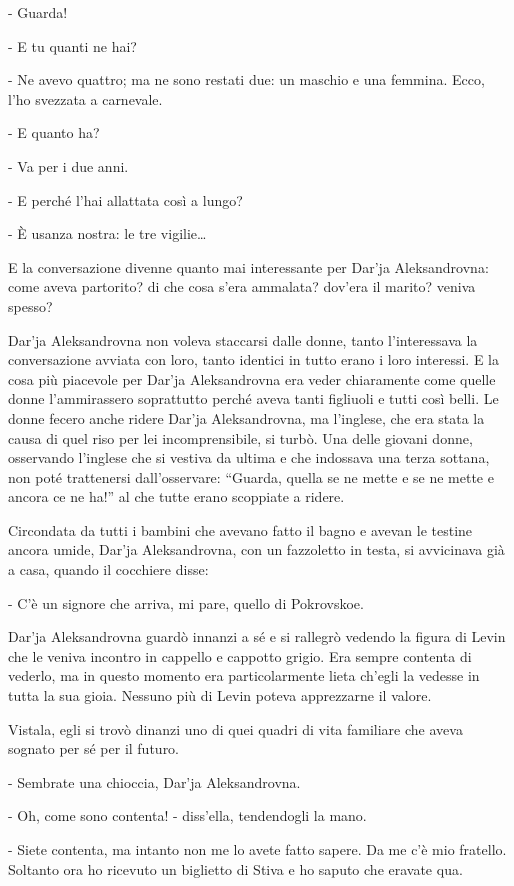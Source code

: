 - Guarda! 

- E tu quanti ne hai? 

- Ne avevo quattro; ma ne sono restati due: un maschio e una femmina. Ecco, l'ho svezzata a carnevale. 

- E quanto ha? 

- Va per i due anni. 

- E perché l'hai allattata così a lungo? 

- È usanza nostra: le tre vigilie\ldots{} 

E la conversazione divenne quanto mai interessante per Dar'ja Aleksandrovna: come aveva partorito? di che cosa s'era ammalata? dov'era il marito? veniva spesso? 

Dar'ja Aleksandrovna non voleva staccarsi dalle donne, tanto l'interessava la conversazione avviata con loro, tanto identici in tutto erano i loro interessi. E la cosa più piacevole per Dar'ja Aleksandrovna era veder chiaramente come quelle donne l'ammirassero soprattutto perché aveva tanti figliuoli e tutti così belli. Le donne fecero anche ridere Dar'ja Aleksandrovna, ma l'inglese, che era stata la causa di quel riso per lei incomprensibile, si turbò. Una delle giovani donne, osservando l'inglese che si vestiva da ultima e che indossava una terza sottana, non poté trattenersi dall'osservare: ``Guarda, quella se ne mette e se ne mette e ancora ce ne ha!'' al che tutte erano scoppiate a ridere. 

Circondata da tutti i bambini che avevano fatto il bagno e avevan le testine ancora umide, Dar'ja Aleksandrovna, con un fazzoletto in testa, si avvicinava già a casa, quando il cocchiere disse: 

- C'è un signore che arriva, mi pare, quello di Pokrovskoe. 

Dar'ja Aleksandrovna guardò innanzi a sé e si rallegrò vedendo la figura di Levin che le veniva incontro in cappello e cappotto grigio. Era sempre contenta di vederlo, ma in questo momento era particolarmente lieta ch'egli la vedesse in tutta la sua gioia. Nessuno più di Levin poteva apprezzarne il valore. 

Vistala, egli si trovò dinanzi uno di quei quadri di vita familiare che aveva sognato per sé per il futuro. 

- Sembrate una chioccia, Dar'ja Aleksandrovna. 

- Oh, come sono contenta! - diss'ella, tendendogli la mano. 

- Siete contenta, ma intanto non me lo avete fatto sapere. Da me c'è mio fratello. Soltanto ora ho ricevuto un biglietto di Stiva e ho saputo che eravate qua. 

